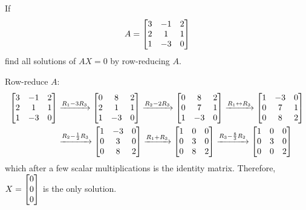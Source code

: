 \begin{xca}
  If \[ A = \begin{bmatrix}3&-1&2 \\ 2&1&1 \\ 1&-3&0\end{bmatrix} \] find all solutions of $AX = 0$ by row-reducing $A$.
\end{xca}
\begin{sol}
  Row-reduce $A$:
  \begin{equation*}
    \begin{split}
      \begin{bmatrix}3&-1&2 \\ 2&1&1 \\ 1&-3&0\end{bmatrix}
      & \xrightarrow{R_1 - 3R_3} \begin{bmatrix}0&8&2 \\ 2&1&1 \\ 1&-3&0\end{bmatrix}
      \xrightarrow{R_2 - 2R_3} \begin{bmatrix}0&8&2 \\ 0&7&1 \\ 1&-3&0\end{bmatrix}
      \xrightarrow{R_1 \leftrightarrow R_3} \begin{bmatrix}1&-3&0 \\ 0&7&1 \\ 0&8&2\end{bmatrix} \\
      & \xrightarrow{R_2 - \frac12 R_3} \begin{bmatrix}1&-3&0 \\ 0&3&0 \\ 0&8&2\end{bmatrix}
      \xrightarrow{R_1 + R_3} \begin{bmatrix}1&0&0 \\ 0&3&0 \\ 0&8&2\end{bmatrix}
      \xrightarrow{R_3 - \frac83 R_2} \begin{bmatrix}1&0&0 \\ 0&3&0 \\ 0&0&2\end{bmatrix}
    \end{split}
  \end{equation*}
  which after a few scalar multiplications is the identity matrix.
  Therefore, $X = \begin{bmatrix}0\\0\\0\end{bmatrix}$ is the only solution.
\end{sol}

